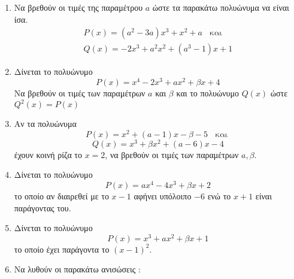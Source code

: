 \documentclass[twoside,nofonts,internet]{askhseis}
\begin{document}

\twocolkentro{\askhseis}
\begin{enumerate}
\item Να βρεθούν οι τιμές της παραμέτρου $ a $ ώστε τα παρακάτω πολυώνυμα να είναι ίσα.
\begin{gather*}
P(x)=(a^2-3a)x^3+x^2+a
\;\;\textrm{ και }\\Q(x) =-2x^3+a^2x^2+(a^3-1) x + 1
\end{gather*}
\item Δίνεται το πολυώνυμο \[ P(x)=x^4-2x^3+ax^2+\beta x+4 \] Να βρεθούν οι τιμές των παραμέτρων $ a $ και $ \beta $ και το πολυώνυμο $ Q(x) $ ώστε $ Q^2(x)=P(x) $
\item Αν τα πολυώνυμα \[ P(x)=x^2+(a-1)x-\beta-5
\;\;\textrm{ και }\]
\[Q(x) = x^3+\beta x^2+(a-6)x-4 \] έχουν κοινή ρίζα το $ x=2 $, να βρεθούν οι τιμές των παραμέτρων $ a,\beta $.
\item Δίνεται το πολυώνυμο \[ P(x)=ax^4-4x^3+\beta x+2 \] το οποίο αν διαιρεθεί με το $ x-1 $ αφήνει υπόλοιπο $ -6 $ ενώ το $ x+1 $ είναι παράγοντας του.
\item Δίνεται το πολυώνυμο \[ P(x)=x^3+ax^2+\beta x+1 \] το οποίο έχει παράγοντα το $ \left(x-1\right)^2 $.
\newpage
\noindent
\item Να λυθούν οι παρακάτω ανισώσεις :
\end{enumerate}
\end{document}
